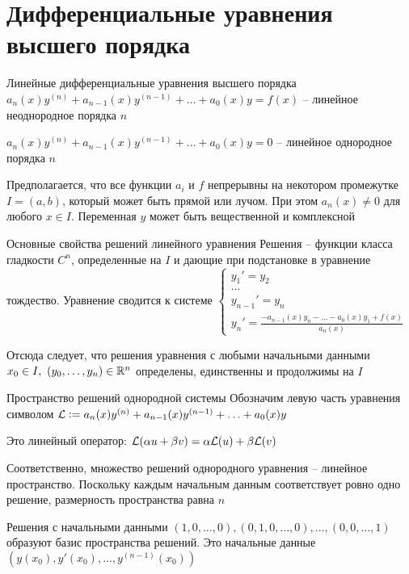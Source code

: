 \documentclass[12pt]{article}
\begin{document}
\newpage

\section{Дифференциальные уравнения высшего порядка}

\begin{defin}{Линейные дифференциальные уравнения высшего порядка}
    $a_n(x)y^{(n)} + a_{n - 1}(x)y^{(n - 1)} + \ldots + a_0(x)y = f(x)$ -- линейное неоднородное порядка $n$

    $a_n(x)y^{(n)} + a_{n - 1}(x)y^{(n - 1)} + \ldots + a_0(x)y = 0$ -- линейное однородное порядка $n$

    Предполагается, что все функции $a_i$ и $f$ непрерывны на некотором промежутке $I = (a, b)$, который может быть прямой или лучом. При этом $a_n(x) \neq 0$ для любого $x \in I$. Переменная $y$ может быть вещественной и комплексной
\end{defin}

\begin{theo}{Основные свойства решений линейного уравнения}
    Решения -- функции класса гладкости $C^n$, определенные на $I$ и дающие при подстановке в уравнение тождество. Уравнение сводится к системе $\begin{cases}
        y_1' = y_2 \\
        \ldots \\
        y_{n - 1}' = y_n \\
        y_n' = \frac{-a_{n - 1}(x)y_n - \ldots - a_0(x)y_1 + f(x)}{a_n(x)}
    \end{cases}$

    Отсюда следует, что решения уравнения с любыми начальными данными $x_0 \in I,\ (y_0, \ldots, y_n) \in \mathbb R^n$ определены, единственны и продолжимы на $I$
\end{theo}

\begin{defin}{Пространство решений однородной системы}
    Обозначим левую часть уравнения символом $\mathcal{L} := a_n(x)y^{(n)} + a_{n - 1}(x)y^{(n - 1)} + \ldots + a_0(x)y$

    Это линейный оператор: $\mathcal{L}(\alpha u + \beta v) = \alpha \mathcal{L}(u) + \beta \mathcal{L}(v)$

    Соответственно, множество решений однородного уравнения -- линейное пространство. Поскольку каждым начальным данным соответствует ровно одно решение, размерность пространства равна $n$

    Решения с начальными данными $(1, 0, \ldots, 0), (0, 1, 0, \ldots, 0), \ldots, (0, 0, \ldots, 1)$ образуют базис пространства решений. Это начальные данные $(y(x_0), y'(x_0), \ldots, y^{(n - 1)}(x_0))$
\end{defin}
\end{document}

